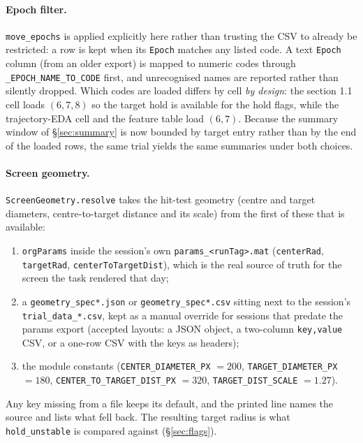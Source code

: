 \documentclass[11pt,a4paper]{article}
\newcommand{\code}[1]{\texttt{\small #1}}
\begin{document}
\paragraph{Epoch filter.} \code{move\_epochs} is applied explicitly here rather
than trusting the CSV to already be restricted: a row is kept when its
\code{Epoch} matches any listed code. A text \code{Epoch} column (from an older
export) is mapped to numeric codes through \code{\_EPOCH\_NAME\_TO\_CODE} first,
and unrecognised names are reported rather than silently dropped. Which codes
are loaded differs by cell \emph{by design}: the section 1.1 cell loads
$(6,7,8)$ so the target hold is available for the hold flags, while the
trajectory-EDA cell and the feature table load $(6,7)$. Because the summary
window of \S\ref{sec:summary} is now bounded by target entry rather than by the
end of the loaded rows, the same trial yields the same summaries under both
choices.

\paragraph{Screen geometry.} \code{ScreenGeometry.resolve} takes the hit-test
geometry (centre and target diameters, centre-to-target distance and its scale)
from the first of these that is available:
\begin{enumerate}[leftmargin=*,itemsep=1pt]
\item \code{orgParams} inside the session's own \code{params\_<runTag>.mat}
(\code{centerRad}, \code{targetRad}, \code{centerToTargetDist}), which is the
real source of truth for the screen the task rendered that day;
\item a \code{geometry\_spec*.json} or \code{geometry\_spec*.csv} sitting next to
the session's \code{trial\_data\_*.csv}, kept as a manual override for sessions
that predate the params export (accepted layouts: a JSON object, a two-column
\code{key,value} CSV, or a one-row CSV with the keys as headers);
\item the module constants (\code{CENTER\_DIAMETER\_PX} $= 200$,
\code{TARGET\_DIAMETER\_PX} $= 180$, \code{CENTER\_TO\_TARGET\_DIST\_PX} $=
320$, \code{TARGET\_DIST\_SCALE} $= 1.27$).
\end{enumerate}
Any key missing from a file keeps its default, and the printed line names the
source and lists what fell back. The resulting target radius is what
\code{hold\_unstable} is compared against (\S\ref{sec:flags}).

\end{document}
